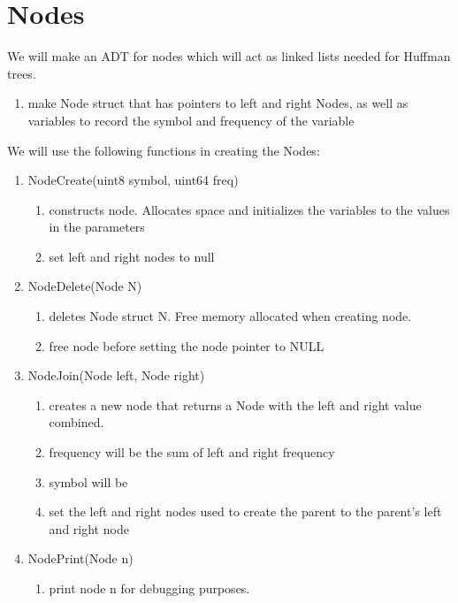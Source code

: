 \documentclass[11pt]{article}
\begin{document}
\section{Nodes}\label{ss:Nodes}
We will make an ADT for nodes which will act as linked lists needed for Huffman trees.
\begin{enumerate}
\item make Node struct that has pointers to left and right Nodes, as well as variables to record the symbol and frequency of the variable
\end{enumerate}
We will use the following functions in creating the Nodes:
\begin{enumerate}
\item NodeCreate(uint8  symbol, uint64 freq)
	\begin{enumerate}
	\item constructs node. Allocates space and initializes the variables to the values in the parameters
	\item set left and right nodes to null
	\end{enumerate}
\item NodeDelete(Node N)
	\begin{enumerate}
	\item deletes Node struct N. Free memory allocated when creating node.
	\item free node before setting the node pointer to NULL
	\end{enumerate}
\item NodeJoin(Node left, Node right)
	\begin{enumerate}
	\item creates a new node that returns a Node with the left and right value combined.
	\item frequency will be the sum of left and right frequency
	\item symbol will be \textdollar
	\item set the left and right nodes used to create the parent to the parent's left and right node 
	\end{enumerate}
\item NodePrint(Node n)
	\begin{enumerate}
	\item print node n for debugging purposes.
	\end{enumerate}
\end{enumerate}
\end{document}
